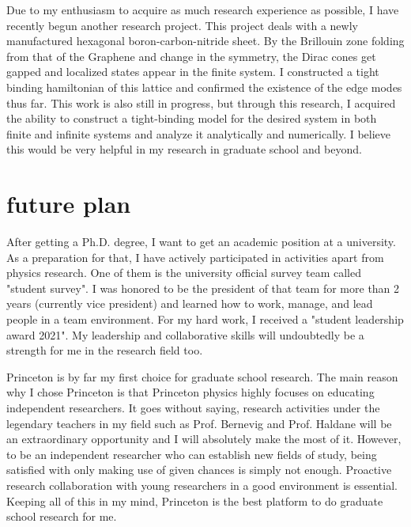 \documentclass[a4]{article}
\begin{document}
Due to my enthusiasm to acquire as much research experience as possible, I have recently begun another research project. This project deals with a newly manufactured hexagonal boron-carbon-nitride sheet. By the Brillouin zone folding from that of the Graphene and change in the symmetry, the Dirac cones get gapped and localized states appear in the finite system. I constructed a tight binding hamiltonian of this lattice and confirmed the existence of the edge modes thus far. This work is also still in progress, but through this research, I acquired the ability to construct a tight-binding model for the desired system in both finite and infinite systems and analyze it analytically and numerically. I believe this would be very helpful in my research in graduate school and beyond.\par


\section{future plan}
After getting a Ph.D. degree, I want to get an academic position at a university. As a preparation for that, I have actively participated in activities apart from physics research. One of them is the university official survey team called "student survey". I was honored to be the president of that team for more than 2 years (currently vice president) and learned how to work, manage, and lead people in a team environment. For my hard work, I received a "student leadership award 2021". My leadership and collaborative skills will undoubtedly be a strength for me in the research field too.\par

Princeton is by far my first choice for graduate school research. The main reason why I chose Princeton is that Princeton physics highly focuses on educating independent researchers. It goes without saying, research activities under the legendary teachers in my field such as Prof. Bernevig and Prof. Haldane will be an extraordinary opportunity and I will absolutely make the most of it. However, to be an independent researcher who can establish new fields of study, being satisfied with only making use of given chances is simply not enough. Proactive research collaboration with young researchers in a good environment is essential. Keeping all of this in my mind, Princeton is the best platform to do graduate school research for me.
\end{document}
